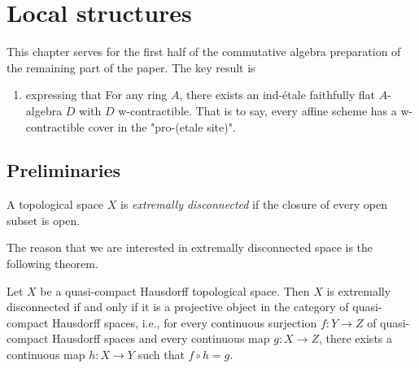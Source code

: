 \chapter{Local structures}

This chapter serves for the first half of the commutative algebra preparation of the remaining part of the paper. The key result is
\begin{enumerate}
  \item {} expressing that For any ring $A$, there 
  exists an ind-étale faithfully flat $A$-algebra $D$ with $D$ w-contractible. That is to say, 
  every affine scheme has a w-contractible cover in the "pro-(etale site)".
\end{enumerate}

\section{Preliminaries}

\begin{definition}
  \label{def:extremally-disconnected}
  \mathlibok

  A topological space \(X\) is \emph{extremally disconnected} if the closure of every open subset is open.
\end{definition}

The reason that we are interested in extremally disconnected space is the following theorem.

\begin{theorem}
  \label{thm:extremally-disconnected-projective}
  \mathlibok
  Let \(X\) be a quasi-compact Hausdorff topological space. Then \(X\) is extremally disconnected if and only if it is a projective object in the category of quasi-compact Hausdorff spaces, i.e., for every continuous surjection \(f : Y \to Z\) of quasi-compact Hausdorff spaces and every continuous map \(g : X \to Z\), there exists a continuous map \(h : X \to Y\) such that \(f \circ h = g\).
\end{theorem}

